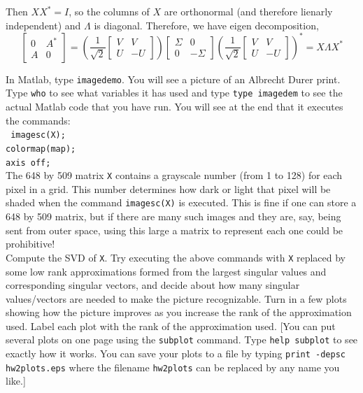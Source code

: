 \documentclass[10pt]{article}
\begin{document}
\begin{solution}[Solution]
Then \( XX^* = I \), so the columns of \( X \) are orthonormal (and therefore lienarly independent) and  \( \Lambda \) is diagonal. Therefore, we have eigen decomposition,
\[ \left[\begin{array}{cc}0 & A^*\\A & 0\end{array}\right] = \left( \dfrac{1}{\sqrt{2}}\left[\begin{array}{cc} V & V \\ U & -U\end{array}\right]\right) \left[\begin{array}{cc}\Sigma & 0\\0 & -\Sigma\end{array}\right]\left( \dfrac{1}{\sqrt{2}}\left[\begin{array}{cc} V & V \\ U & -U\end{array}\right]\right)^* = X\Lambda X^* \tag*{\qed} \]
\end{solution}

\begin{problem}
In Matlab, type {\tt imagedemo}.  You will see a picture of an Albrecht Durer print.  Type {\tt who} to see what variables it has used and type {\tt type imagedem} to see the actual Matlab code
that you have run.  You will see at the end that it executes the commands: \\
{\tt
imagesc(X); \\
colormap(map); \\
axis off;
} \\
The 648 by 509 matrix {\tt X} contains a grayscale number (from 1 to 128) for each pixel in a grid.
This number determines how dark or light that pixel will be shaded when the command 
{\tt imagesc(X)} is executed.  This is fine if one can store a 648 by 509 matrix, but if there are 
many such images and they are, say, being sent from outer space, using this large a matrix to represent 
each one could be prohibitive! \\
Compute the SVD of {\tt X}.  Try executing the above commands with {\tt X} replaced by some low rank
approximations formed from the largest singular values and corresponding singular vectors,
and decide about how many singular values/vectors are needed to make the picture recognizable.  
Turn in a few plots showing how the picture improves as you increase the rank
of the approximation used.  Label each plot with the rank of the approximation used.
[You can put several plots on one page using the {\tt subplot} command.
Type {\tt help subplot} to see exactly how it works.  You can save your plots to a file by
typing {\tt print -depsc hw2plots.eps} where the filename {\tt hw2plots} can be replaced
    by any name you like.]
\end{problem}
\end{document}
